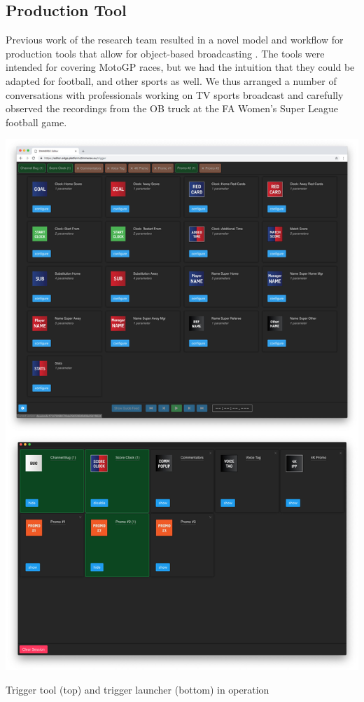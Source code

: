 \documentclass[sigchi-a, authorversion]{acmart}
\begin{document}
\subsection{Production Tool}

Previous work of the research team resulted in a novel model and workflow for
production tools that allow for object-based broadcasting \cite{Li:2018_TVX}.
The tools were intended for covering MotoGP races, but we had the intuition that
they could be adapted for football, and other sports as well. We thus arranged a number
of conversations with professionals working on TV sports broadcast and carefully
observed the recordings from the OB truck at the FA Women's Super League football
game.

\begin{marginfigure}
    \includegraphics[width=\marginparwidth-10pt]{Figures/triggertool.jpg}
    \caption{Trigger tool (top) and trigger launcher (bottom) in operation}
    \label{fig:triggertool}
\end{marginfigure}
\end{document}
